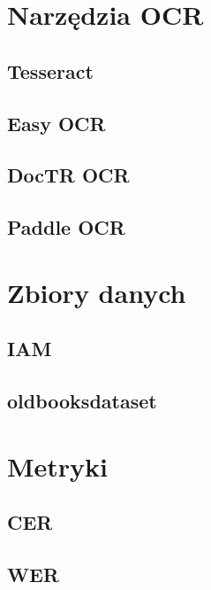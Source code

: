 \label{chapter:related}
\raggedright

\section{Narzędzia OCR}


\subsection{Tesseract}


\subsection{Easy OCR}


\subsection{DocTR OCR}


\subsection{Paddle OCR}


\section{Zbiory danych}


\subsection{IAM}


\subsection{old\-books\-dataset}


\section{Metryki}


\subsection{CER}


\subsection{WER}

